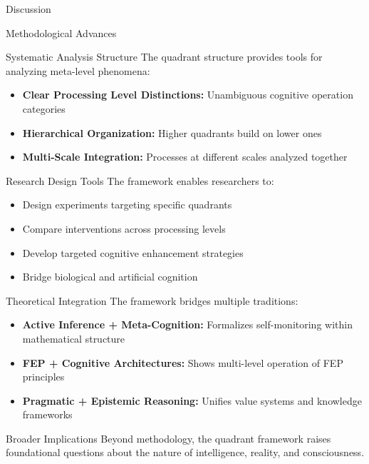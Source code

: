 \documentclass[
  ignorenonframetext,
]{beamer}
\providecommand{\tightlist}{%
  \setlength{\itemsep}{0pt}\setlength{\parskip}{0pt}}
\begin{document}
\begin{frame}{Discussion}
\begin{block}{Methodological Advances}
\begin{block}{Systematic Analysis Structure}
\protect{}\label{systematic-analysis-structure}
The quadrant structure provides tools for analyzing meta-level
phenomena:

\begin{itemize}
\tightlist
\item
  \textbf{Clear Processing Level Distinctions:} Unambiguous cognitive
  operation categories
\item
  \textbf{Hierarchical Organization:} Higher quadrants build on lower
  ones
\item
  \textbf{Multi-Scale Integration:} Processes at different scales
  analyzed together
\end{itemize}
\end{block}

\begin{block}{Research Design Tools}
\protect{}\label{research-design-tools}
The framework enables researchers to:

\begin{itemize}
\tightlist
\item
  Design experiments targeting specific quadrants
\item
  Compare interventions across processing levels
\item
  Develop targeted cognitive enhancement strategies
\item
  Bridge biological and artificial cognition
\end{itemize}
\end{block}

\begin{block}{Theoretical Integration}
\protect{}\label{theoretical-integration}
The framework bridges multiple traditions:

\begin{itemize}
\tightlist
\item
  \textbf{Active Inference + Meta-Cognition:} Formalizes self-monitoring
  within mathematical structure
\item
  \textbf{FEP + Cognitive Architectures:} Shows multi-level operation of
  FEP principles
\item
  \textbf{Pragmatic + Epistemic Reasoning:} Unifies value systems and
  knowledge frameworks
\end{itemize}
\end{block}
\end{block}

\begin{block}{Broader Implications}
\protect{}\label{sec:broader_implications}
Beyond methodology, the quadrant framework raises foundational questions
about the nature of intelligence, reality, and consciousness.


\end{block}
\end{frame}
\end{document}
